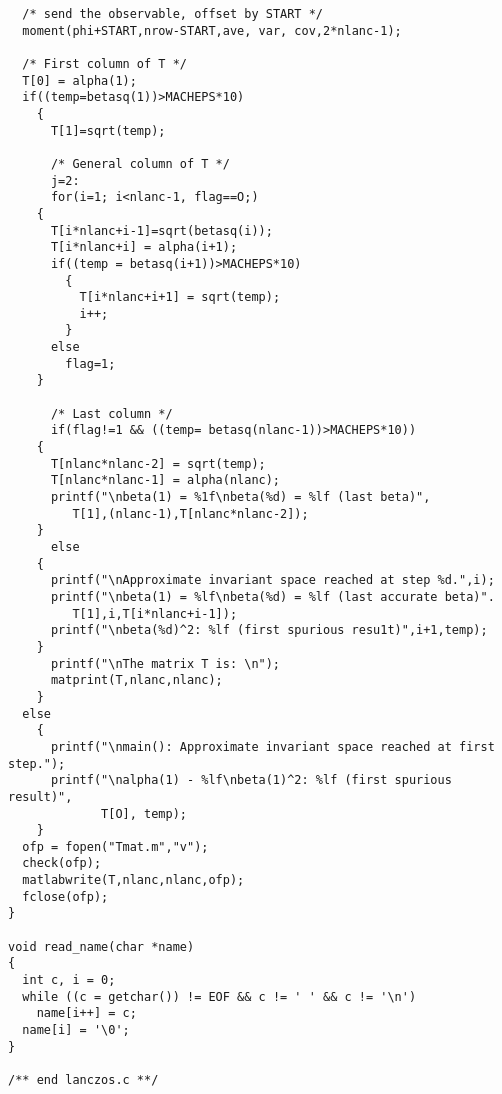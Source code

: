 \documentclass[12pt,letterpaper]{report}
\theoremstyle{plain}
\theoremstyle{definition}
\theoremstyle{remark}
\numberwithin{theorem}{chapter}
\numberwithin{claim}{chapter}
\numberwithin{equation}{chapter}
\numberwithin{conjecture}{chapter}
\newcommand\<{\ensuremath{\langle}}
\renewcommand\>{\ensuremath{\rangle}}
\begin{document}
{\begin{verbatim}
  /* send the observable, offset by START */
  moment(phi+START,nrow-START,ave, var, cov,2*nlanc-1);

  /* First column of T */
  T[0] = alpha(1);
  if((temp=betasq(1))>MACHEPS*10)
    {
      T[1]=sqrt(temp);

      /* General column of T */
      j=2:
      for(i=1; i<nlanc-1, flag==O;)
	{
	  T[i*nlanc+i-1]=sqrt(betasq(i));
	  T[i*nlanc+i] = alpha(i+1);
	  if((temp = betasq(i+1))>MACHEPS*10)
	    {
	      T[i*nlanc+i+1] = sqrt(temp);
	      i++;
	    }
	  else
	    flag=1;
	}

      /* Last column */
      if(flag!=1 && ((temp= betasq(nlanc-1))>MACHEPS*10))
	{
	  T[nlanc*nlanc-2] = sqrt(temp);
	  T[nlanc*nlanc-1] = alpha(nlanc);
	  printf("\nbeta(1) = %1f\nbeta(%d) = %lf (last beta)",
		 T[1],(nlanc-1),T[nlanc*nlanc-2]);
	}
      else
	{
	  printf("\nApproximate invariant space reached at step %d.",i);
	  printf("\nbeta(1) = %lf\nbeta(%d) = %lf (last accurate beta)".
		 T[1],i,T[i*nlanc+i-1]);
	  printf("\nbeta(%d)^2: %lf (first spurious resu1t)",i+1,temp);
	}
      printf("\nThe matrix T is: \n");
      matprint(T,nlanc,nlanc);
    }
  else
    {
      printf("\nmain(): Approximate invariant space reached at first step.");
      printf("\nalpha(1) - %lf\nbeta(1)^2: %lf (first spurious result)", 
             T[O], temp);
    }
  ofp = fopen("Tmat.m","v");
  check(ofp);
  matlabwrite(T,nlanc,nlanc,ofp);
  fclose(ofp);
}

void read_name(char *name)
{
  int c, i = 0;
  while ((c = getchar()) != EOF && c != ' ' && c != '\n')
    name[i++] = c;
  name[i] = '\0';
}

/** end lanczos.c **/


\end{verbatim}}

\vskip2cm
\end{document}
